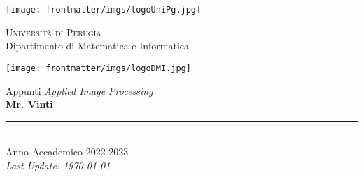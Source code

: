 
\thispagestyle{empty} %

\noindent %
\texttt{[image: frontmatter/imgs/logoUniPg.jpg]}
\begin{minipage}[b]{0.7\textwidth}
    \centering
    {\Large \textsc{Universit{\`a} di Perugia}}\\
    \vspace{0.4 em}
    {\large Dipartimento di Matematica e Informatica}
    \vspace{0.6 em}
\end{minipage}%
\texttt{[image: frontmatter/imgs/logoDMI.jpg]}

\vspace{8 em}

\begin{center}
    {\Huge Appunti \textit{Applied Image Processing}}\\
    \vspace{5 em}
    {\Huge \textbf{Mr. Vinti}}\\

    \vfill

    \rule{380pt}{.4pt}\\
    \vspace{1.2 em}
    \large{Anno Accademico 2022-2023}\\
    \vspace{.9 em}
    \small{\textit{Last Update: \today{}}}
\end{center}

